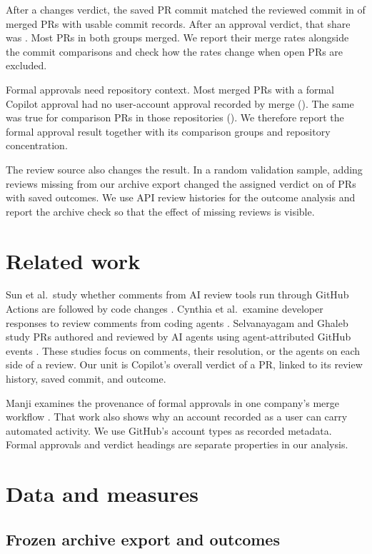 \documentclass[11pt,letterpaper]{article}
\begin{document}
After a changes verdict, the saved PR commit matched the reviewed
commit in \ChangesMatchRate{} of merged PRs with usable commit records.
After an approval verdict, that share was \ReadyMatchRate{}. Most PRs in both groups merged.
We report their merge rates alongside the commit comparisons and check
how the rates change when open PRs are excluded.

Formal approvals need repository context. Most merged PRs with a formal
Copilot approval had no user-account approval recorded by merge
(\FormalNoUserRate{}). The same was true for comparison PRs in those
repositories (\SharedBaselineRate{}). We therefore report the formal
approval result together with its comparison groups and repository
concentration.

The review source also changes the result. In a random validation
sample, adding reviews missing from our archive export changed the
assigned verdict on \AuditGroupChangeRate{} of PRs with saved outcomes.
We use API review histories for the outcome analysis and report the
archive check so that the effect of missing reviews is visible.

\section{Related work}

Sun et al.\ study whether comments from AI review tools run through GitHub
Actions are followed by code changes \cite{sun2025}. Cynthia et al.\
examine developer responses to review comments from coding agents
\cite{cynthia2026}. Selvanayagam and Ghaleb study PRs authored and reviewed
by AI agents using agent-attributed GitHub events
\cite{selvanayagam2026}. These studies focus on comments, their resolution,
or the agents on each side of a review. Our unit is Copilot's overall
verdict of a PR, linked to its review history, saved commit, and outcome.

Manji examines the provenance of formal approvals in one company's merge
workflow \cite{manji2026}. That work also shows why an account recorded as
a user can carry automated activity. We use GitHub's account types as
recorded metadata. Formal approvals and verdict headings are separate
properties in our analysis.

\section{Data and measures}

\subsection{Frozen archive export and outcomes}
\end{document}
